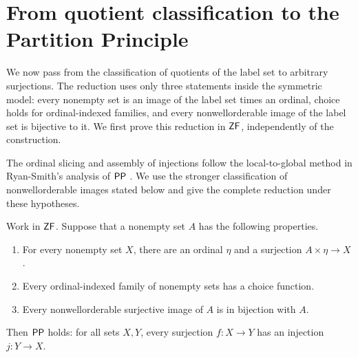 \section{From quotient classification to the Partition Principle}
\label{sec:conclusion}

We now pass from the classification of quotients of the label set to
arbitrary surjections.  The reduction uses only three statements inside
the symmetric model: every nonempty set is an image of the label set
times an ordinal, choice holds for ordinal-indexed families, and every
nonwellorderable image of the label set is bijective to it.  We first
prove this reduction in $\mathsf{ZF}$, independently of the construction.

The ordinal slicing and assembly of injections follow the local-to-global
method in Ryan-Smith's analysis of $\mathsf{PP}$
\cite[Propositions~3.17 and~3.20]{RyanSmith2025}. We use the stronger
classification of nonwellorderable images stated below and give the
complete reduction under these hypotheses.

\begin{lemma}\label{lemma:pp-reduction}
Work in $\mathsf{ZF}$.  Suppose that a nonempty set $A$ has the following
properties.
\begin{enumerate}
\item For every nonempty set $X$, there are an ordinal $\eta$ and
a surjection $A\times\eta\longrightarrow X$.
\item Every ordinal-indexed family of nonempty sets has a choice
function.
\item Every nonwellorderable surjective image of $A$ is in bijection
with $A$.
\end{enumerate}
Then $\mathsf{PP}$ holds: for all sets $X,Y$, every surjection
$f:X\longrightarrow Y$ has an injection $j:Y\longrightarrow X$.
\end{lemma}

